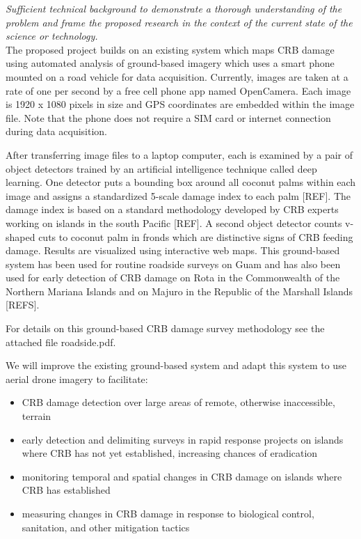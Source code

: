 \documentclass[11pt,english,letterpaper]{scrartcl}
\begin{document}
\textit{Sufficient technical background to demonstrate a thorough understanding of the problem and frame the proposed research in the context of the current state of the science or technology.}\\

The proposed project builds on an existing system which maps CRB damage using automated analysis of ground-based imagery which uses a smart phone mounted on a road vehicle for data acquisition. Currently, images are taken at a rate of one per second by a free cell phone app named OpenCamera. Each image is 1920 x 1080 pixels in size and GPS coordinates are embedded within the image file. Note that the phone does not require a SIM card or internet connection during data acquisition. 

After transferring image files to a laptop computer, each is examined by a pair of object detectors trained by an artificial intelligence technique called deep learning. One detector puts a bounding box around all coconut palms within each image and assigns a standardized 5-scale damage index to each palm [REF]. The damage index is based on a standard methodology developed by CRB experts working on islands in the south Pacific [REF]. A second object detector counts v-shaped cuts to coconut palm in fronds which are distinctive signs of CRB feeding damage. Results are visualized using interactive web maps. This ground-based system has been used for routine roadside surveys on Guam and has also been used for early detection of CRB damage on Rota in the Commonwealth of the Northern Mariana Islands and on Majuro in the Republic of the Marshall Islands [REFS].

For details on this ground-based CRB damage survey methodology see the attached file roadside.pdf.

We will improve the existing ground-based system and adapt this system to use aerial drone imagery to facilitate:
\begin{itemize}
	\item CRB damage detection over large areas of remote, otherwise inaccessible, terrain
	\item early detection and delimiting surveys in rapid response projects on islands where CRB has not yet established, increasing chances of eradication
	\item monitoring temporal and spatial changes in CRB damage on islands where CRB has	established
	\item measuring changes in CRB damage in response to biological control, sanitation, and other mitigation tactics
\end{itemize}
\end{document}
